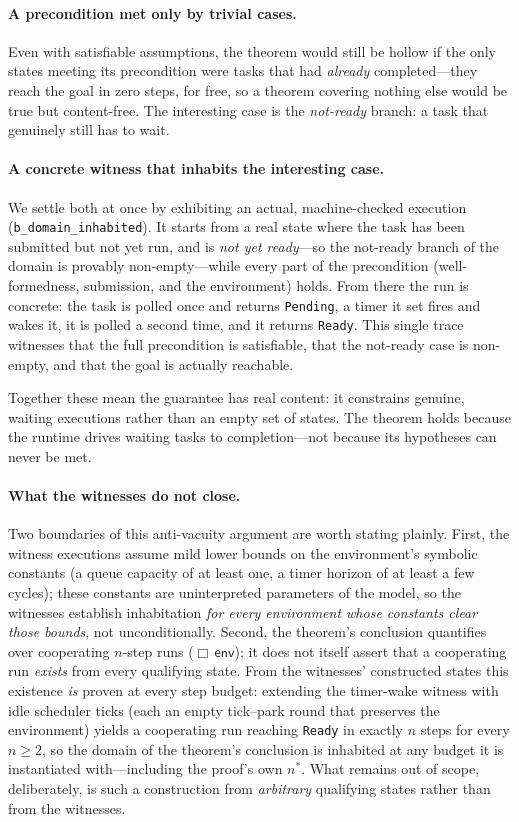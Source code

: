 \documentclass[11pt]{article}
\theoremstyle{plain}
\theoremstyle{definition}
\begin{document}
\paragraph{A precondition met only by trivial cases.} Even with satisfiable assumptions, the
theorem would still be hollow if the only states meeting its precondition were tasks that had
\emph{already} completed---they reach the goal in zero steps, for free, so a theorem covering
nothing else would be true but content-free. The interesting case is the \emph{not-ready}
branch: a task that genuinely still has to wait.

\paragraph{A concrete witness that inhabits the interesting case.} We settle both at once by
exhibiting an actual, machine-checked execution (\lstinline|b_domain_inhabited|). It starts
from a real state where the task has been submitted but not yet run, and is \emph{not yet
ready}---so the not-ready branch of the domain is provably non-empty---while every part of the
precondition (well-formedness, submission, and the environment) holds. From there the run is
concrete: the task is polled once and returns \texttt{Pending}, a timer it set fires and wakes
it, it is polled a second time, and it returns \texttt{Ready}. This single trace witnesses that
the full precondition is satisfiable, that the not-ready case is non-empty, and that the goal is
actually reachable.

Together these mean the guarantee has real content: it constrains genuine, waiting executions
rather than an empty set of states. The theorem holds because the runtime drives waiting tasks
to completion---not because its hypotheses can never be met.

\paragraph{What the witnesses do not close.} Two boundaries of this anti-vacuity argument are
worth stating plainly. First, the witness executions assume mild lower bounds on the
environment's symbolic constants (a queue capacity of at least one, a timer horizon of at
least a few cycles); these constants are uninterpreted parameters of the model, so the
witnesses establish inhabitation \emph{for every environment whose constants clear those
bounds}, not unconditionally. Second, the theorem's conclusion quantifies over cooperating
$n$-step runs ($\Box\,\mathsf{env}$); it does not itself assert that a cooperating run
\emph{exists} from every qualifying state. From the witnesses' constructed states this
existence \emph{is} proven at every step budget: extending the timer-wake witness with idle
scheduler ticks (each an empty tick--park round that preserves the environment) yields a
cooperating run reaching \texttt{Ready} in exactly $n$ steps for every $n \geq 2$, so the
domain of the theorem's conclusion is inhabited at any budget it is instantiated
with---including the proof's own $n^{*}$. What remains out of scope, deliberately, is such a
construction from \emph{arbitrary} qualifying states rather than from the witnesses.
\end{document}
